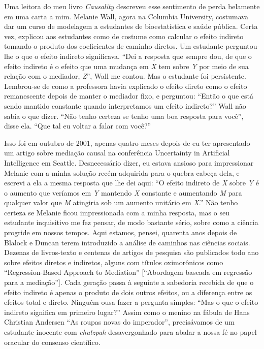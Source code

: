 \documentclass[11pt,a5paper,twoside]{book}
\begin{document}
Uma leitora do meu livro \textit{Causality} descreveu esse sentimento de perda belamente em uma carta a mim. Melanie Wall, agora na Columbia University, costumava dar um curso de modelagem a estudantes de bioestatística e saúde pública. Certa vez, explicou aos estudantes como de costume como calcular o efeito indireto tomando o produto dos coeficientes de caminho diretos. Um estudante perguntou-lhe o que o efeito indireto significava. “Dei a resposta que sempre dou, de que o efeito indireto é o efeito que uma mudança em \textit{X} tem sobre \textit{Y} por meio de sua relação com o mediador, \textit{Z}”, Wall me contou. Mas o estudante foi persistente. Lembrou-se de como a professora havia explicado o efeito direto como o efeito remanescente depois de manter o mediador fixo, e perguntou: “Então o que está sendo mantido constante quando interpretamos um efeito indireto?” Wall não sabia o que dizer. “Não tenho certeza se tenho uma boa resposta para você”, disse ela. “Que tal eu voltar a falar com você?”

Isso foi em outubro de 2001, apenas quatro meses depois de eu ter apresentado um artigo sobre mediação causal na conferência Uncertainty in Artificial Intelligence em Seattle. Desnecessário dizer, eu estava ansioso para impressionar Melanie com a minha solução recém-adquirida para o quebra-cabeça dela, e escrevi a ela a mesma resposta que lhe dei aqui: “O efeito indireto de \textit{X} sobre \textit{Y} é o aumento que veríamos em \textit{Y} mantendo \textit{X} constante e aumentando \textit{M} para qualquer valor que \textit{M} atingiria sob um aumento unitário em \textit{X}.” Não tenho certeza se Melanie ficou impressionada com a minha resposta, mas o seu estudante inquisitivo me fez pensar, de modo bastante sério, sobre como a ciência progride em nossos tempos. Aqui estamos, pensei, quarenta anos depois de Blalock e Duncan terem introduzido a análise de caminhos nas ciências sociais. Dezenas de livros-texto e centenas de artigos de pesquisa são publicados todo ano sobre efeitos diretos e indiretos, alguns com títulos oximorônicos como “Regression-Based Approach to Mediation” [“Abordagem baseada em regressão para a mediação”]. Cada geração passa à seguinte a sabedoria recebida de que o efeito indireto é apenas o produto de dois outros efeitos, ou a diferença entre os efeitos total e direto. Ninguém ousa fazer a pergunta simples: “Mas o que o efeito indireto significa em primeiro lugar?” Assim como o menino na fábula de Hans Christian Andersen “As roupas novas do imperador”, precisávamos de um estudante inocente com \textit{chutzpah} desavergonhado para abalar a nossa fé no papel oracular do consenso científico.
\end{document}
